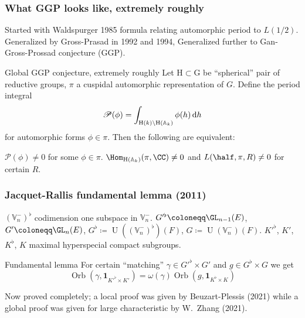\documentclass[11pt]{beamer}
\DeclareMathOperator{\Orb}{Orb}
\DeclareMathOperator{\U}{U}
\newcommand{\VV}{\mathbb{V}}
\newcommand{\G}{\mathrm{G}}
\renewcommand{\H}{\mathrm{H}}
\begin{document}
\begin{frame}
  \frametitle{What GGP looks like, extremely roughly}
  \begin{itemize}
  \ii Started with Waldspurger 1985 formula
    relating automorphic period to $L(1/2)$.
  \ii Generalized by Gross-Prasad in 1992 and 1994,
  \ii Generalized further to Gan-Gross-Prossad conjecture (GGP).
  \end{itemize}
  \begin{exampleblock}{Global GGP conjecture, extremely roughly}
    Let $\H \subset \G$ be ``spherical'' pair of reductive groups,
    $\pi$ a cuspidal automorphic representation of $G$.
    Define the period integral
    \[ \mathscr P(\phi) = \int_{\H(k) \backslash \H(\mathbb A_k)} \phi(h) \odif h \]
    for automorphic forms $\phi \in \pi$.
    Then the following are equivalent:
    \begin{enumerate}
      \ii $\mathscr P(\phi) \neq 0$ for some $\phi \in \pi$.
      \ii $\Hom_{\H(\mathbb A_k)}(\pi, \CC) \neq 0$ and $L(\half, \pi , R) \neq 0$
      for certain $R$.
    \end{enumerate}
  \end{exampleblock}
\end{frame}

\begin{frame}
  \frametitle{Jacquet-Rallis fundamental lemma (2011)}
  \begin{itemize}
  \ii $(\VV_n^-)^\flat$ codimension one subspace in $\VV_n^-$.
  \ii $G'^\flat \coloneqq \GL_{n-1}(E)$, $G' \coloneqq \GL_n(E)$,
    $G^\flat \coloneqq \U((\VV_n^-)^\flat)(F)$, $G \coloneqq \U(\VV_n^-)(F)$.
  \ii $K'^\flat$, $K'$, $K^\flat$, $K$ maximal hyperspecial compact subgroups.
  \end{itemize}
  \begin{block}{Fundamental lemma}
    For certain ``matching''
    $\gamma \in G'^\flat \times G'$ and $g \in G^\flat \times G$
    we get
   \[ \Orb(\gamma, \mathbf{1}_{K'^\flat \times K'}) = \omega(\gamma) \Orb(g, \mathbf{1}_{K^\flat \times K}) \]
  \end{block}
  Now proved completely; a local proof was given by Beuzart-Plessis (2021)
  while a global proof was given for large characteristic by W.\ Zhang (2021).
\end{frame}
\end{document}
